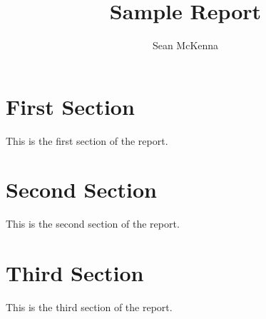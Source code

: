 \documentclass[11pt]{article}
\title{Sample Report}
\author{Sean McKenna}
\begin{document}
\section{First Section}
This is the first section of the report.


\section{Second Section}
This is the second section of the report.


\section{Third Section}
This is the third section of the report.


\raggedright


\end{document}
